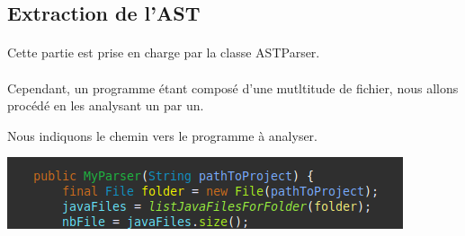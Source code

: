 \documentclass[a4paper]{article}
\begin{document}
    \newpage
    \begin{multicols}{2}
        [
        ]
        \section{Extraction de l'AST}
        \paragraph{} Cette partie est prise en charge par la classe ASTParser.
        \paragraph{} Cependant, un programme étant composé d'une mutltitude de fichier, nous allons procédé en les analysant un par un.
        
        Nous indiquons le chemin vers le programme à analyser.

        \noindent\includegraphics[width=.47\textwidth]{parser/source}


\end{multicols}
\end{document}
